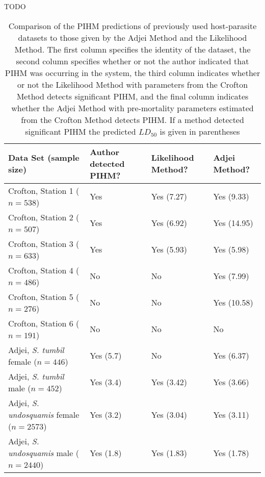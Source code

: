 \documentclass[12pt, a4paper]{article}
\begin{document}
TODO

\singlespacing



\renewcommand{\arraystretch}{1.2}
\begin{sidewaystable}

    \caption{Comparison of the PIHM predictions of previously used host-parasite datasets to those given by the Adjei Method and the Likelihood Method. The first column specifies the identity of the dataset, the second column specifies whether or not the author indicated that PIHM was occurring in the system, the third column indicates whether or not the Likelihood Method with parameters from the Crofton Method detects significant PIHM, and the final column indicates whether the Adjei Method with pre-mortality parameters estimated from the Crofton Method detects PIHM.  If a method detected significant PIHM the predicted $LD_{50}$ is given in parentheses}

    \centering
    \begin{tabular}{l  p{3cm} p{3cm} l}

    \hline\hline
    Data Set (sample size) & Author detected PIHM? & Likelihood Method?  & Adjei Method? \\

    \hline
    Crofton, Station 1 ($n=538$) & Yes & Yes (7.27) & Yes (9.33) \\
    Crofton, Station 2 ($n=507$) & Yes & Yes (6.92) &  Yes (14.95)\\
    Crofton, Station 3 ($n=633$) & Yes & Yes (5.93) &  Yes (5.98) \\
    Crofton, Station 4 ($n=486$) & No & No &  Yes (7.99) \\
    Crofton, Station 5 ($n=276$) & No & No & Yes (10.58) \\
    Crofton, Station 6 ($n=191$) & No & No & No \\
    Adjei, \emph{S. tumbil} female ($n=446$) & Yes (5.7) & No & Yes (6.37) \\
    Adjei, \emph{S. tumbil} male ($n=452$) & Yes (3.4) & Yes (3.42) & Yes (3.66)  \\
    Adjei, \emph{S. undosquamis} female ($n=2573$) & Yes (3.2) & Yes (3.04) & Yes (3.11) \\
    Adjei, \emph{S. undosquamis} male ($n=2440$) & Yes (1.8) & Yes (1.83) & Yes (1.78) \\


    \end{tabular}
    \label{table:pihm}

\end{sidewaystable}
\end{document}
